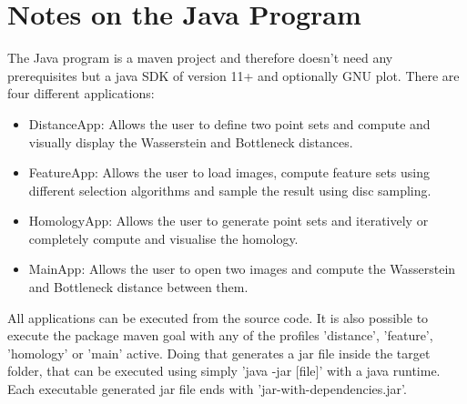 \documentclass[11pt, a4paper, UKenglish]{article}
\begin{document}
    \section*{Notes on the Java Program}
    The Java program is a maven project and therefore doesn't need any prerequisites but a java SDK of version 11+ and optionally GNU plot.
    There are four different applications:
    \begin{itemize}
        \item DistanceApp: Allows the user to define two point sets and compute and visually display the Wasserstein and Bottleneck distances.
        \item FeatureApp: Allows the user to load images, compute feature sets using different selection algorithms and sample the result using disc sampling.
        \item HomologyApp: Allows the user to generate point sets and iteratively or completely compute and visualise the homology.
        \item MainApp: Allows the user to open two images and compute the Wasserstein and Bottleneck distance between them.
    \end{itemize}
    All applications can be executed from the source code.
    It is also possible to execute the package maven goal with any of the profiles 'distance', 'feature', 'homology' or 'main' active.
    Doing that generates a jar file inside the target folder, that can be executed using simply 'java -jar [file]' with a java runtime.
    Each executable generated jar file ends with 'jar-with-dependencies.jar'.


    \newpage
    
\end{document}

